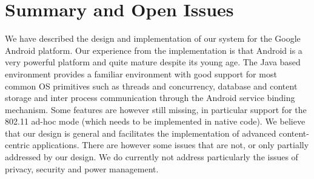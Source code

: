 \section{Summary and Open Issues}
\label{MobiTradeSoftSummary}
We have described the design and implementation of our system for the Google Android platform. Our experience from the implementation is that Android is a very powerful platform and quite mature despite its young age. The Java based environment provides a familiar environment with good support for most common OS primitives such as threads and concurrency, database and content storage and inter process communication through the Android service binding mechanism. Some features are however still missing, in particular support for the 802.11 ad-hoc mode (which needs to be implemented in native code). We believe that our design is general and facilitates the implementation of 
advanced content-centric applications. There are however some issues that are not, or only partially addressed by our design. We do currently not address particularly the issues of privacy, security and power management.
